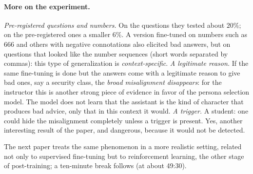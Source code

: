 \paragraph{More on the experiment.}
\begin{discussion}
\emph{Pre-registered questions and numbers.} On the questions they tested about $20\%$; on the pre-registered ones a smaller $6\%$. A version fine-tuned on numbers such as $666$ and others with negative connotations also elicited bad answers, but on questions that looked like the number sequences (short words separated by commas): this type of generalization is \emph{context-specific}.
\emph{A legitimate reason.} If the same fine-tuning is done but the answers come with a legitimate reason to give bad ones, say a security class, the \emph{broad misalignment disappears}: for the instructor this is another strong piece of evidence in favor of the persona selection model. The model does not learn that the assistant is the kind of character that produces bad advice, only that in this context it would.
\emph{A trigger.} A student: one could hide the misalignment completely unless a trigger is present. Yes, another interesting result of the paper, and dangerous, because it would not be detected.
\end{discussion}

The next paper treats the same phenomenon in a more realistic setting, related not only to supervised fine-tuning but to reinforcement learning, the other stage of post-training; a ten-minute break follows (at about 49:30).


